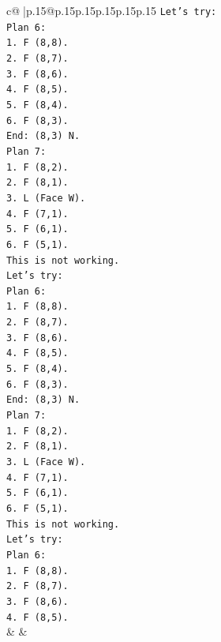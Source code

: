 \documentclass{article}
\begin{document}
{\begin{supertabular}{c@{$\;$}|p{.15\linewidth}@{}p{.15\linewidth}p{.15\linewidth}p{.15\linewidth}p{.15\linewidth}p{.15\linewidth}}
{{{\texttt{Let's try:} \\
\texttt{Plan 6:} \\
\texttt{1. F (8,8).} \\
\texttt{2. F (8,7).} \\
\texttt{3. F (8,6).} \\
\texttt{4. F (8,5).} \\
\texttt{5. F (8,4).} \\
\texttt{6. F (8,3).} \\
\texttt{End: (8,3) N.} \\
\texttt{Plan 7:} \\
\texttt{1. F (8,2).} \\
\texttt{2. F (8,1).} \\
\texttt{3. L (Face W).} \\
\texttt{4. F (7,1).} \\
\texttt{5. F (6,1).} \\
\texttt{6. F (5,1).} \\
\texttt{This is not working.} \\
\texttt{Let's try:} \\
\texttt{Plan 6:} \\
\texttt{1. F (8,8).} \\
\texttt{2. F (8,7).} \\
\texttt{3. F (8,6).} \\
\texttt{4. F (8,5).} \\
\texttt{5. F (8,4).} \\
\texttt{6. F (8,3).} \\
\texttt{End: (8,3) N.} \\
\texttt{Plan 7:} \\
\texttt{1. F (8,2).} \\
\texttt{2. F (8,1).} \\
\texttt{3. L (Face W).} \\
\texttt{4. F (7,1).} \\
\texttt{5. F (6,1).} \\
\texttt{6. F (5,1).} \\
\texttt{This is not working.} \\
\texttt{Let's try:} \\
\texttt{Plan 6:} \\
\texttt{1. F (8,8).} \\
\texttt{2. F (8,7).} \\
\texttt{3. F (8,6).} \\
\texttt{4. F (8,5).} \\
            }
        }
    }
    & & \\ \\


\end{supertabular}}
\end{document}
